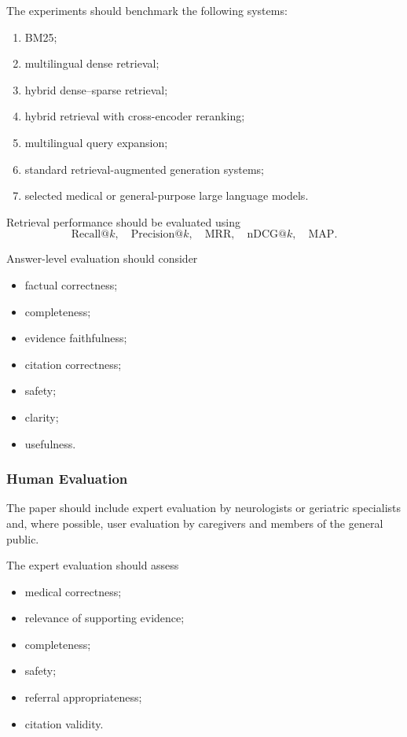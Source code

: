 \documentclass{article}
\begin{document}
The experiments should benchmark the following systems:
\begin{enumerate}
    \item BM25;
    \item multilingual dense retrieval;
    \item hybrid dense--sparse retrieval;
    \item hybrid retrieval with cross-encoder reranking;
    \item multilingual query expansion;
    \item standard retrieval-augmented generation systems;
    \item selected medical or general-purpose large language models.
\end{enumerate}

Retrieval performance should be evaluated using
\begin{equation}
    \mathrm{Recall@}k,\quad
    \mathrm{Precision@}k,\quad
    \mathrm{MRR},\quad
    \mathrm{nDCG@}k,\quad
    \mathrm{MAP}.
\end{equation}

Answer-level evaluation should consider
\begin{itemize}
    \item factual correctness;
    \item completeness;
    \item evidence faithfulness;
    \item citation correctness;
    \item safety;
    \item clarity;
    \item usefulness.
\end{itemize}

\subsubsection{Human Evaluation}
The paper should include expert evaluation by neurologists or geriatric specialists and, where possible, user evaluation by caregivers and members of the general public.

The expert evaluation should assess
\begin{itemize}
    \item medical correctness;
    \item relevance of supporting evidence;
    \item completeness;
    \item safety;
    \item referral appropriateness;
    \item citation validity.
\end{itemize}
\end{document}
